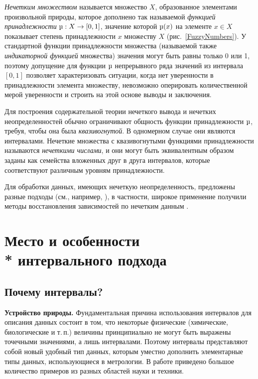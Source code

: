 \documentclass[a5paper,openany]{book}
\renewcommand{\mu}{\text{\textmu}}
\begin{document}
{\emph{Нечетким множеством} %
называется множество $X$, 
образованное элементами произвольной природы, которое дополнено так называемой 
\emph{функцией принадлежности} $\mu: X\to[0, 1]$, значение которой $\mu(x)$ на элементе 
$x\in X$ показывает степень принадлежности $x$ множеству $X$ (рис.~\ref{FuzzyNumbers}). 
У стандартной функции принадлежности множества (называемой также \emph{индикаторной функцией} 
множества) значения могут быть равны только 0 или 1, поэтому допущение для функции $\mu$ 
непрерывного ряда значений из интервала $[0, 1]$ позволяет характеризовать ситуации, когда 
нет уверенности в принадлежности элемента множеству, невозможно оперировать количественной мерой   
уверенности и строить на этой основе  выводы и заключения.

Для построения содержательной теории нечеткого вывода и нечетких неопределенностей 
обычно ограничивают общность функции принадлежности $\mu$, требуя, чтобы она была 
\emph{квазивогнутой}. 
В одномерном случае они являются интервалами. 
Нечеткие множества с квазивогнутыми 
функциями принадлежности называются \emph{нечеткими числами}, и они могут быть 
эквивалентным образом заданы как семейства вложенных друг в друга интервалов, 
которые соответствуют различным уровням принадлежности.   

Для обработки данных, имеющих нечеткую неопределенность, предложены разные подходы 
(см., например, \cite{NguyenKreinWuXiang}), в частности, 
широкое применение получили методы восстановления зависимостей по нечетким данным \cite{Boukezzoula2021}. 



	\section[Место и особенности интервального подхода]%
{Место и особенности \\* интервального подхода} 


\subsection{Почему интервалы?} \label{NatureIntervals} 

{\bf Устройство природы.}
Фундаментальная причина использования интервалов для описания данных состоит в том, что некоторые физические (химические, биологические и 
т.\,п.) величины принципиально не могут быть выражены точечными значениями, а лишь 
интервалами. Поэтому интервалы представляют собой новый удобный тип данных, которым 
уместно дополнить элементарные типы данных, использующиеся в метрологии. 
В работе \cite{SPbSTU2021} приведено большое количество примеров из разных областей науки и техники. 

}
\end{document}
